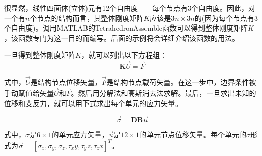 \begin{CJK*}{UTF8}{song}
很显然，线性四面体(立体)元有12个自由度——每个节点有\num{3}个自由度。因此，对一个有$ n $个节点的结构而言，其整体刚度矩阵$ K $应该是$ 3n \times 3n $的(因为每个节点有\num{3}个自由度)。调用MATLAB的TetrahedronAssemble函数可以得到整体刚度矩阵$ K $，该函数专门为这一目的而编写。后面的示例将会详细介绍该函数的用法。

一旦得到整体刚度矩阵$ K $，就可以列出以下方程组：
\begin{equation}
\mathbf{K} \vec{U} = \vec{F}
\end{equation}

式中，$ \vec{U} $是结构节点位移矢量，$ \vec{F} $是结构节点载荷矢量。在这一步中，边界条件被手动赋值给矢量$ \vec{U} $和$ \vec{F} $。然后用分解法和高斯消去法求解。最后，一旦求出未知的位移和支反力，就可以用下式求出每个单元的应力矢量。

\begin{equation}
\vec{\sigma} = \mathbf{D}\mathbf{B} \vec{u}
\end{equation}

式中，$ \sigma $是$ 6\times 1 $的单元应力矢量，$ \vec{u} $是$ 12 \times 1 $的单元节点位移矢量。每个单元的$ \sigma $形式为$ \vec{\sigma} = [\sigma_x, \sigma_y, \sigma_z, \tau_xy, \tau_yz, \tau_zx]^T $。
\end{CJK*}




